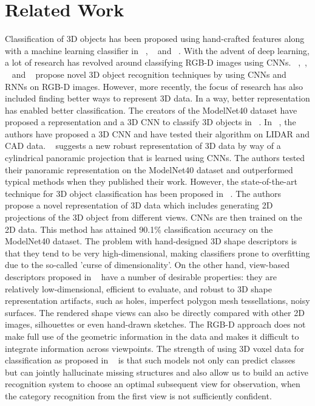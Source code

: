 \documentclass[10pt,twocolumn,letterpaper]{article}
\begin{document}
\section{Related Work}
Classification of 3D objects has been proposed using hand-crafted features along with a machine learning classifier in ~\cite{lai20093d}, ~\cite{teichman2011towards} and ~\cite{behley2012performance}. With the advent of deep learning, a lot of research has revolved around classifying RGB-D images using CNNs. ~\cite{hoft2014fast},~\cite{socher2012convolutional}, ~\cite{lenz2015deep} and ~\cite{gupta2014learning} propose novel 3D object recognition techniques by using CNNs and RNNs on RGB-D images. 
However, more recently, the focus of research has also included finding better ways to represent 3D data. In a way, better representation has enabled better classification.
The creators of the ModelNet40 dataset have proposed a representation and a 3D CNN to classify 3D objects in ~\cite{Authors14}. In ~\cite{voxnet}, the authors have proposed a 3D CNN and have tested their algorithm on LIDAR and CAD data. ~\cite{deeppano} suggests a new robust representation of 3D data by way of a cylindrical panoramic projection that is learned using CNNs. The authors tested their panoramic representation on the ModelNet40 dataset and outperformed typical methods when they published their work. However, the state-of-the-art technique for 3D object classification has been proposed in ~\cite{Authors14b}. The authors propose a novel representation of 3D data which includes generating 2D projections of the 3D object from different views. CNNs are then trained on the 2D data. This method has attained 90.1\% classification accuracy on the ModelNet40 dataset. The problem with hand-designed 3D shape descriptors is that they tend to be very high-dimensional, making classifiers prone to overfitting due to the so-called 'curse of dimensionality'. On the other hand, view-based descriptors proposed in ~\cite{Authors14b} have a number of desirable properties: they are relatively low-dimensional, efficient to evaluate, and robust to 3D shape representation artifacts, such as holes, imperfect polygon mesh tessellations, noisy surfaces. The rendered shape views can also be directly compared with other 2D images, silhouettes or even hand-drawn sketches. The RGB-D approach does not make full use of the geometric information in the data and makes it difficult to integrate information across viewpoints. The strength of using 3D voxel data for classification as proposed in ~\cite{Authors14} is that such models not only can predict classes but can jointly hallucinate missing structures and also allow us to build an active recognition system to choose an optimal subsequent view for observation, when the category recognition from the first view is not sufficiently confident.
\end{document}
